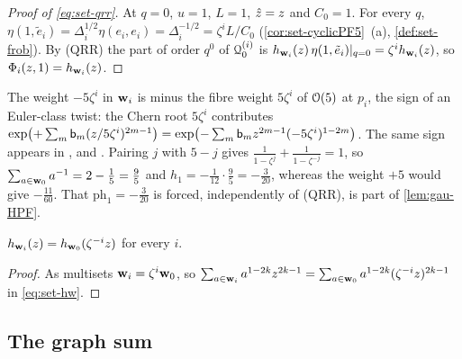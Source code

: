 \begin{proof}[Proof of \eqref{eq:set-qrr}]
At $q=0$, $u=1$, $L=1$, $\hat{z}=z$ and $C_0=1$. For every $q$, $\eta(1,\tilde e_i)=\Delta_i^{1/2}\eta(e_i,e_i)=\Delta_i^{-1/2}=\zeta^iL/C_0$ (\cref{cor:set-cyclicPF5}~(a), \cref{def:set-frob}). By (QRR) the part of order $q^0$ of $\mathcal{Q}^{(i)}_0$ is $h_{\mathbf{w}_i}(z)\,\eta(1,\tilde e_i)|_{q=0}=\zeta^ih_{\mathbf{w}_i}(z)$, so $\Phi_i(z,1)=h_{\mathbf{w}_i}(z)$.
\end{proof}

\begin{rmk}
\label{rmk:set-qrrsign}
The weight $-5\zeta^i$ in $\mathbf{w}_i$ is minus the fibre weight $5\zeta^i$ of $\mathcal{O}(5)$ at $p_i$, the sign of an Euler-class twist: the Chern root $5\zeta^i$ contributes $\exp\bigl(+\sum_m\mathsf{b}_m(z/5\zeta^i)^{2m-1}\bigr)=\exp\bigl(-\sum_m\mathsf{b}_mz^{2m-1}(-5\zeta^i)^{1-2m}\bigr)$. The same sign appears in \cite[(17)]{GJR18}, \cite[Corollary~1]{MR2276766} and \cite[(26)]{LP20}. Pairing $j$ with $5-j$ gives $\frac1{1-\zeta^j}+\frac1{1-\zeta^{-j}}=1$, so $\sum_{a\in\mathbf{w}_0}a^{-1}=2-\frac15=\frac95$ and $h_1=-\frac1{12}\cdot\frac95=-\frac3{20}$, whereas the weight $+5$ would give $-\frac{11}{60}$. That $\mathrm{ph}_1=-\frac3{20}$ is forced, independently of (QRR), is part of \cref{lem:gau-HPF}.
\end{rmk}

\begin{lem}
\label{lem:set-hrot}
$h_{\mathbf{w}_i}(z)=h_{\mathbf{w}_0}(\zeta^{-i}z)$ for every $i$.
\end{lem}

\begin{proof}
As multisets $\mathbf{w}_i=\zeta^i\mathbf{w}_0$, so $\sum_{a\in\mathbf{w}_i}a^{1-2k}z^{2k-1}=\sum_{a\in\mathbf{w}_0}a^{1-2k}(\zeta^{-i}z)^{2k-1}$ in \eqref{eq:set-hw}.
\end{proof}

\subsection{The graph sum}
\label{sec:set-graph}

